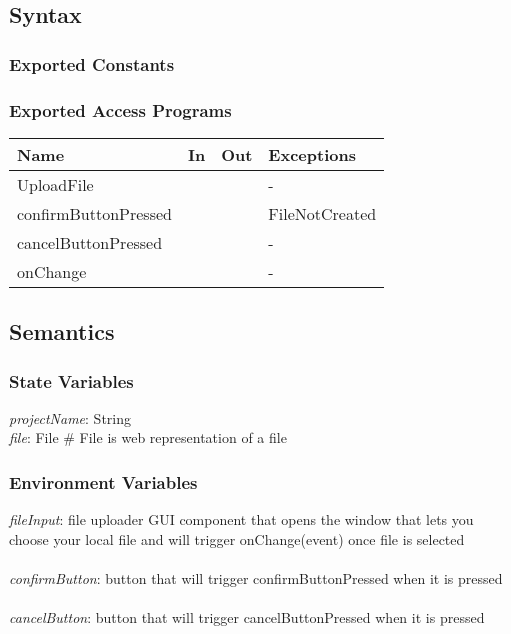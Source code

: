 \documentclass[12pt, titlepage]{article}
\begin{document}
	\subsection{Syntax}
	
	\subsubsection{Exported Constants}
	
	\subsubsection{Exported Access Programs}
	
	\begin{center}
		\begin{tabular}{p{2cm} p{4cm} p{4cm} p{2cm}}
			\hline
			\textbf{Name} & \textbf{In} & \textbf{Out} & \textbf{Exceptions} \\
			\hline
			UploadFile &  &  & - \\
			\hline
			confirmButtonPressed &  &  & FileNotCreated \\
			\hline
			cancelButtonPressed &  &  & - \\
			\hline
			onChange &  &  & - \\
			\hline
		\end{tabular}
	\end{center}
	
	\subsection{Semantics}
	
	\subsubsection{State Variables}
	\textit{projectName}: String\\
	\textit{file}: File \# File is web representation of a file
	
	
	\subsubsection{Environment Variables}
	
	\textit{fileInput}: file uploader GUI component that opens the window that lets you choose your local file and will trigger onChange(event) once file is selected \\\\
	\textit{confirmButton}: button that will trigger confirmButtonPressed when it is pressed \\\\ 
	\textit{cancelButton}: button that will trigger cancelButtonPressed when it is pressed \\\\ 
	
\end{document}

